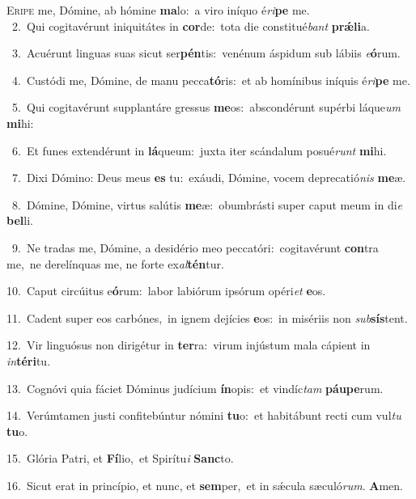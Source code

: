 \lettrine{\initial\textcolor{\initialcolor}{E}}{ripe} me, Dómine, ab hómine \textbf{ma}\-lo:~\star a viro iníquo é\-\textit{ri}\-\textbf{pe} me.\\
{\numbfont\textcolor{\numbcolor}{~2.}}~Qui cogitavérunt iniquitátes in \textbf{cor}\-de:~\star tota die constitué\textit{bant} \textbf{prǽ}\-\textbf{li}a.\par
{\numbfont\textcolor{\numbcolor}{~3.}}~Acuérunt linguas suas sicut ser\-\textbf{pén}\-tis:~\star venénum áspidum sub lábiis \textit{e}\-\textbf{ó}rum.\par
{\numbfont\textcolor{\numbcolor}{~4.}}~Custódi me, Dómine, de manu pecca\-\textbf{tó}\-ris:~\star et ab homínibus iníquis é\-\textit{ri}\-\textbf{pe} me.\par
{\numbfont\textcolor{\numbcolor}{~5.}}~Qui cogitavérunt supplantáre gressus \textbf{me}\-os:~\star abscondérunt supérbi láque\textit{um} \textbf{mi}\-hi:\par
{\numbfont\textcolor{\numbcolor}{~6.}}~Et funes extendérunt in \textbf{lá}\-queum:~\star juxta iter scándalum posué\textit{runt} \textbf{mi}\-hi.\par
{\numbfont\textcolor{\numbcolor}{~7.}}~Dixi Dómino: Deus meus \textbf{es} tu:~\star exáudi, Dómine, vocem deprecatió\textit{nis} \textbf{me}\-æ.\par
{\numbfont\textcolor{\numbcolor}{~8.}}~Dómine, Dómine, virtus salútis \textbf{me}\-æ:~\star obumbrásti super caput meum in di\textit{e} \textbf{bel}\-li.\par
{\numbfont\textcolor{\numbcolor}{~9.}}~Ne tradas me, Dómine, a desidério meo peccatóri:~\dagger cogitavérunt \textbf{con}\-tra me,~\star ne derelínquas me, ne forte ex\-\textit{al}\-\textbf{tén}tur.\par
{\numbfont\textcolor{\numbcolor}{10.}}~Caput circúitus e\-\textbf{ó}\-rum:~\star labor labiórum ipsórum opéri\textit{et} \textbf{e}\-os.\par
{\numbfont\textcolor{\numbcolor}{11.}}~Cadent super eos carbónes,~\dagger in ignem dejícies \textbf{e}\-os:~\star in misériis non \textit{sub}\-\textbf{sís}tent.\par
{\numbfont\textcolor{\numbcolor}{12.}}~Vir linguósus non dirigétur in \textbf{ter}\-ra:~\star virum injústum mala cápient in \textit{in}\-\textbf{tér}\textbf{i}tu.\par
{\numbfont\textcolor{\numbcolor}{13.}}~Cognóvi quia fáciet Dóminus judícium \textbf{ín}\-opis:~\star et vindíc\textit{tam} \textbf{páu}\-\textbf{pe}rum.\par
{\numbfont\textcolor{\numbcolor}{14.}}~Verúmtamen justi confitebúntur nómini \textbf{tu}\-o:~\star et habitábunt recti cum vul\textit{tu} \textbf{tu}\-o.\par
{\numbfont\textcolor{\numbcolor}{15.}}~Glória Patri, et \textbf{Fí}\-lio,~\star et Spirítu\textit{i} \textbf{Sanc}\-to.\par
{\numbfont\textcolor{\numbcolor}{16.}}~Sicut erat in princípio, et nunc, et \textbf{sem}\-per,~\star et in sǽcula sæculó\-\textit{rum}\-. \textbf{A}\-men.\par
